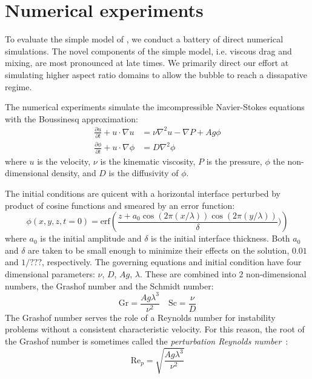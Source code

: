 \section{Numerical experiments}

To evaluate the simple model of , we conduct a battery of direct numerical simulations.
The novel components of the simple model, i.e. viscous drag and mixing, are most pronounced at late times.
We primarily direct our effort at simulating higher aspect ratio domains to allow the bubble to reach a dissapative regime.

The numerical experiments simulate the imcompressible Navier-Stokes equations with the Boussinesq approximation:
\begin{align}
\frac{\partial u}{\partial t} + u \cdot \nabla u &= \nu \nabla^2 u - \nabla P + A g \phi \\
\frac{\partial \phi}{\partial t} + u \cdot \nabla \phi &= D \nabla^2 \phi 
\end{align}
where $u$ is the velocity,
$\nu$ is the kinematic viscosity,
$P$ is the pressure,
$\phi$ the non-dimensional density,
and $D$ is the diffusivity of $\phi$.

The initial conditions are quicent with a horizontal interface perturbed by product of cosine functions and smeared by an error function:
\begin{equation}
\phi(x,y,z,t=0) = \text{erf}\left(\frac{z + a_0 \cos(2 \pi (x/\lambda)) \cos(2 \pi (y/\lambda))}{\delta})\right)
\end{equation}
where $a_0$ is the initial amplitude and $\delta$ is the initial interface thickness.
Both $a_0$ and $\delta$ are taken to be small enough to minimize their effects on the solution, $0.01$ and $1/???$, respectively.
The governing equations and initial condition have four dimensional parameters: $\nu$, $D$, $Ag$, $\lambda$.
These are combined into 2 non-dimensional numbers, the Grashof number and the Schmidt number:
\begin{equation}
\text{Gr} = \frac{A g \lambda^3}{\nu^2} \quad \text{Sc} = \frac{\nu}{D}
\end{equation}
The Grashof number serves the role of a Reynolds number for instability problems without a consistent characteristic velocity.
For this reason, the root of the Grashof number is sometimes called the \textit{perturbation Reynolds number}~\cite{Wei2011}:
\begin{equation}
\text{Re}_p = \sqrt{\frac{A g \lambda^3}{\nu^2}}
\end{equation}

